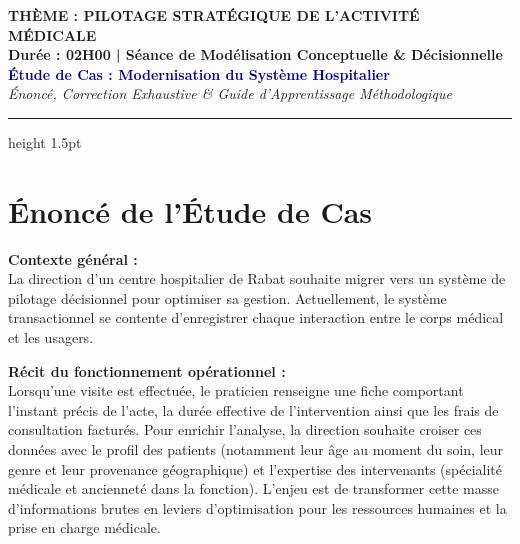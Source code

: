\documentclass[11pt, a4paper]{article}
\begin{document}
\begin{center}
    {\large\textcolor{myteal}{\textbf{THÈME : PILOTAGE STRATÉGIQUE DE L'ACTIVITÉ MÉDICALE}}} \\
    \vspace{0.2cm}
    {\small\textcolor{textgray}{\textbf{Durée : 02H00 | Séance de Modélisation Conceptuelle \& Décisionnelle}}} \\
    \vspace{0.4cm}
    {\LARGE\textbf{\textcolor{darkblue}{Étude de Cas : Modernisation du Système Hospitalier}}} \\
    \vspace{0.2cm}
    {\large\textcolor{myblue}{\textit{Énoncé, Correction Exhaustive \& Guide d'Apprentissage Méthodologique}}}
    \vspace{0.3cm}
\end{center}
\hrule height 1.5pt \textcolor{darkblue}{}
\vspace{0.4cm}

\section{Énoncé de l'Étude de Cas}

\noindent\textbf{\textcolor{myblue}{Contexte général :}} \\
La direction d'un centre hospitalier de Rabat souhaite migrer vers un système de pilotage décisionnel pour optimiser sa gestion. Actuellement, le système transactionnel se contente d'enregistrer chaque interaction entre le corps médical et les usagers.

\vspace{0.2cm}
\noindent\textbf{\textcolor{myblue}{Récit du fonctionnement opérationnel :}} \\
Lorsqu'une visite est effectuée, le praticien renseigne une fiche comportant l'instant précis de l'acte, la durée effective de l'intervention ainsi que les frais de consultation facturés. Pour enrichir l'analyse, la direction souhaite croiser ces données avec le profil des patients (notamment leur âge au moment du soin, leur genre et leur provenance géographique) et l'expertise des intervenants (spécialité médicale et ancienneté dans la fonction). L'enjeu est de transformer cette masse d'informations brutes en leviers d'optimisation pour les ressources humaines et la prise en charge médicale.
\end{document}
